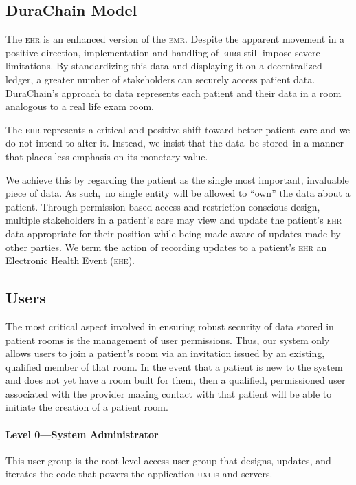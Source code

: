 \subsection{DuraChain Model}
The \textsc{ehr} is an enhanced version of the \textsc{emr}. Despite the apparent movement in a positive direction, implementation and handling of \textsc{ehr}s still impose severe limitations.\cite{palmaEHR} By standardizing this data and displaying it on a decentralized ledger, a greater number of stakeholders can securely access patient data. DuraChain’s approach to data represents each patient and their data in a room analogous to a real life exam room.%

The \textsc{ehr} represents a critical and positive shift toward better patient care and we do not intend to alter it. Instead, we insist that the data be stored in a manner that places less emphasis on its monetary value.%

We achieve this by regarding the patient as the single most important, invaluable piece of data. As such, no single entity will be allowed to ``own'' the data about a patient. Through permission-based access and restriction-conscious design, multiple stakeholders in a patient’s care may view and update the patient's \textsc{ehr} data appropriate for their position while being made aware of updates made by other parties. We term the action of recording updates to a patient’s \textsc{ehr} an Electronic Health Event (\textsc{ehe}).%

\subsection{Users}
\label{users}
The most critical aspect involved in ensuring robust security of data stored in patient rooms is the management of user permissions. Thus, our system only allows users to join a patient's room via an invitation issued by an existing, qualified member of that room. In the event that a patient is new to the system and does not yet have a room built for them, then a qualified, permissioned user associated with the provider making contact with that patient will be able to initiate the creation of a patient room.%

\paragraph{Level 0---System Administrator}
This user group is the root level access user group that designs, updates, and iterates the code that powers the application \textsc{uxui}s and servers.%

